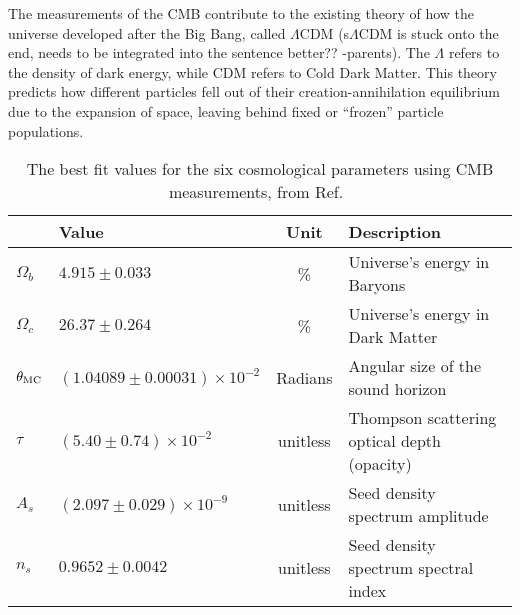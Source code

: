 The measurements of the CMB contribute to the existing theory of how the universe developed after the Big Bang, called $\Lambda$CDM {\color{red}(s$\Lambda$CDM is stuck onto the end, needs to be integrated into the sentence better?? -parents)}.
The $\Lambda$ refers to the density of dark energy, while CDM refers to Cold Dark Matter.
This theory predicts how different particles fell out of their creation-annihilation equilibrium due to the expansion of space, leaving behind fixed or ``frozen'' particle populations.

%   

\begin{table}[t]
  \centering
  \begin{tabular}{llcl}
               & \textbf{Value}                 & \textbf{Unit} & \textbf{Description} \\
    \hline 
    $\Omega_b$ & $ 4.915  \pm0.033                 $ & \%       & Universe's energy in Baryons \\
    $\Omega_c$ & $ 26.37  \pm0.264                 $ & \%       & Universe's energy in Dark Matter \\
    $\theta_{\textrm{MC}}$ & $(1.04089\pm0.00031)\times 10^{-2}$ & Radians  & Angular size of the sound horizon \\
    $\tau$     & $(5.40   \pm0.74   )\times 10^{-2}$ & unitless & Thompson scattering optical depth (opacity)\\
    $A_s$      & $(2.097  \pm0.029  )\times 10^{-9}$ & unitless & Seed density spectrum amplitude \\
    $n_s$      & $ 0.9652 \pm0.0042                $ & unitless & Seed density spectrum spectral index \\
    \hline 
  \end{tabular}
  \caption[6 Cosmological Parameters]{
    The best fit values for the six cosmological parameters using CMB measurements, from Ref.~\cite{planck_dm_limit}}
  \label{tab:six_params}
\end{table}

